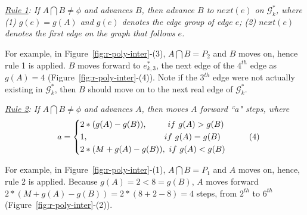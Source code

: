 
\vspace{1ex}
\ni \emph{\underline{Rule 1}:
If $A \bigcap B \ne \phi$ and advances $B$, then advance $B$ to $next(e)$ on $\mathcal{G}^*_k$, where (1) $g(e) = g(A)$ and $g(e)$ denotes the edge group of edge $e$; (2) $next(e)$ denotes the first edge on the graph that follows $e$.}
\vspace{1ex}

For example, in Figure~\ref{fig:r-poly-inter}-(3), $A \bigcap B = P_2$ and $B$ moves on, hence rule 1 is applied. $B$ moves forward to $e^*_{k, 3}$, \ie the next edge of the $4^{th}$ edge as $g(A) = 4$ (Figure~\ref{fig:r-poly-inter}-(4)).
Note if the $3^{th}$ edge were not actually existing in $\mathcal{G}^*_k$, then $B$ should move on to the next real edge of $\mathcal{G}^*_k$.


\vspace{1ex}
\ni \emph{\underline{Rule 2}:
If $A \bigcap B \ne \phi$ and advances $A$, then moves $A$ forward ``$a$" steps, where}
\begin{equation*}
\label{equ-rule2}
\small
    \hspace{2ex} a =  \left\{
    \begin{aligned}
        & 2*(g(A) - g(B)),  \hspace{5ex} ~if  ~g(A) > g(B) \\
        & {1},              \hspace{20.5ex}~if  ~g(A) = g(B) \\
        & 2*(M+g(A) - g(B)), ~if  ~g(A) < g(B) \\
    \end{aligned}
    \right.       \hspace{6ex}(4)
\end{equation*}


For example, in Figure~\ref{fig:r-poly-inter}-(1), $A \bigcap B = P_1$ and $A$ moves on, hence, rule 2 is applied. Because $g(A)=2 < 8=g(B)$, $A$ moves forward $2*(M+g(A) - g(B)) = 2*(8+2-8)= 4$ steps, \ie from $2^{th}$ to $6^{th}$ (Figure~\ref{fig:r-poly-inter}-(2)).


